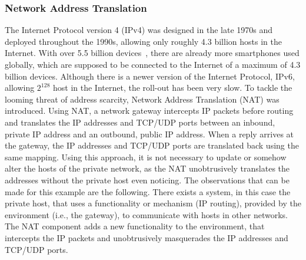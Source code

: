 \subsubsection{Network Address Translation}
The Internet Protocol version 4 (IPv4) was designed in the late 1970s and deployed throughout the 1990s, allowing only roughly 4.3 billion hosts in the Internet.
With over 5.5 billion devices~\cite{eriscsson2021report}, there are already more smartphones used globally, which are supposed to be connected to the Internet of a maximum of 4.3 billion devices.
Although there is a newer version of the Internet Protocol, IPv6, allowing $2^{128}$ host in the Internet, the roll-out has been very slow.
To tackle the looming threat of address scarcity, Network Address Translation (NAT) was introduced.
Using NAT, a network gateway intercepts IP packets before routing and translates the IP addresses and TCP/UDP ports between an inbound, private IP address and an outbound, public IP address.
When a reply arrives at the gateway, the IP addresses and TCP/UDP ports are translated back using the same mapping.
Using this approach, it is not necessary to update or somehow alter the hosts of the private network, as the NAT unobtrusively translates the addresses without the private host even noticing.
The observations that can be made for this example are the following.
There exists a system, in this case the private host, that uses a functionality or mechanism (IP routing), provided by the environment (i.e., the gateway), to communicate with hosts in other networks.
The NAT component adds a new functionality to the environment, that intercepts the IP packets and unobtrusively masquerades the IP addresses and TCP/UDP ports.



